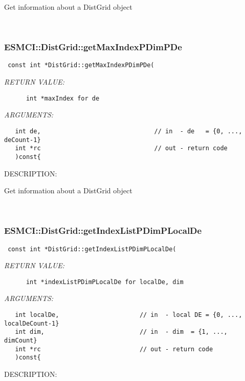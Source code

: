       Get information about a DistGrid object
   
 
\mbox{}\hrulefill\
 
\subsubsection [ESMCI::DistGrid::getMaxIndexPDimPDe] {ESMCI::DistGrid::getMaxIndexPDimPDe}


  
\begin{verbatim} const int *DistGrid::getMaxIndexPDimPDe(\end{verbatim}{\em RETURN VALUE:}
\begin{verbatim}      int *maxIndex for de\end{verbatim}{\em ARGUMENTS:}
\begin{verbatim}   int de,                               // in  - de   = {0, ..., deCount-1}
   int *rc                               // out - return code
   )const{\end{verbatim}
{\sf DESCRIPTION:\\ }


      Get information about a DistGrid object
   
 
\mbox{}\hrulefill\
 
\subsubsection [ESMCI::DistGrid::getIndexListPDimPLocalDe] {ESMCI::DistGrid::getIndexListPDimPLocalDe}


  
\begin{verbatim} const int *DistGrid::getIndexListPDimPLocalDe(\end{verbatim}{\em RETURN VALUE:}
\begin{verbatim}      int *indexListPDimPLocalDe for localDe, dim\end{verbatim}{\em ARGUMENTS:}
\begin{verbatim}   int localDe,                      // in  - local DE = {0, ..., localDeCount-1}
   int dim,                          // in  - dim  = {1, ..., dimCount}
   int *rc                           // out - return code
   )const{\end{verbatim}
{\sf DESCRIPTION:\\ }


